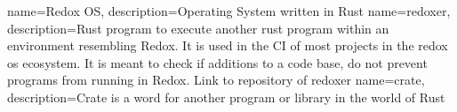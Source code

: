 
{
	name={Redox OS},
	description={Operating System written in Rust}
}
{
	name={redoxer},
	description={Rust program to execute another rust program within an environment resembling Redox.
			It is used in the CI of most projects in the redox os ecosystem.
			It is meant to check if additions to a code base, do not prevent programs from running in Redox.
			Link to repository of redoxer \cite{link_repos_redoxer}}
}
{
	name={crate},
	description={Crate is a word for another program or library in the world of Rust}
}


\glsaddall
